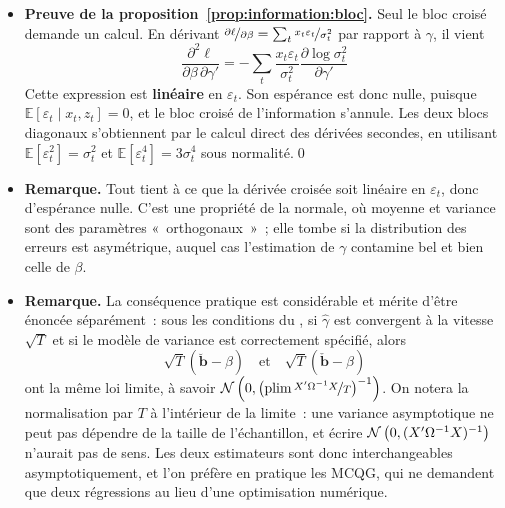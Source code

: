 \documentclass[10pt]{beamer}
\begin{document}
\begin{notes}

  \begin{itemize}

  \item \textbf{Preuve de la proposition~\ref{prop:information:bloc}.} Seul le
    bloc croisé demande un calcul. En dérivant
    $\nicefrac{\partial\ell}{\partial\beta} =
    \sum_t\nicefrac{x_t\varepsilon_t}{\sigma_t^2}$ par rapport à $\gamma$, il
    vient
    \[
      \frac{\partial^2\ell}{\partial\beta\,\partial\gamma'} =
      -\sum_t \frac{x_t\varepsilon_t}{\sigma_t^2}
      \frac{\partial \log\sigma_t^2}{\partial\gamma'}
    \]
    Cette expression est \textbf{linéaire} en $\varepsilon_t$. Son espérance est
    donc nulle, puisque $\mathbb E[\varepsilon_t\mid x_t,z_t]=0$, et le bloc
    croisé de l'information s'annule. Les deux blocs diagonaux s'obtiennent par
    le calcul direct des dérivées secondes, en utilisant
    $\mathbb E[\varepsilon_t^2]=\sigma_t^2$ et
    $\mathbb E[\varepsilon_t^4]=3\sigma_t^4$ sous normalité.\qed\newline

  \item \textbf{Remarque.} Tout tient à ce que la dérivée croisée soit linéaire
    en $\varepsilon_t$, donc d'espérance nulle. C'est une propriété de la
    normale, où moyenne et variance sont des paramètres «~orthogonaux~»~; elle
    tombe si la distribution des erreurs est asymétrique, auquel cas
    l'estimation de $\gamma$ contamine bel et bien celle de $\beta$.\newline

  \item \textbf{Remarque.} La conséquence pratique est considérable et mérite
    d'être énoncée séparément~: sous les conditions du , si
    $\hat\gamma$ est convergent à la vitesse $\sqrt T$ et si le modèle de
    variance est correctement spécifié, alors
    \[
      \sqrt T\left(\breve{\mathbf b} - \beta\right)
      \quad\text{et}\quad
      \sqrt T\left(\check{\mathbf b} - \beta\right)
    \]
    ont la même loi limite, à savoir
    $\mathcal N\left(0,\left(\text{plim}\,\nicefrac{X'\Omega^{-1}X}{T}\right)^{-1}\right)$.
    On notera la normalisation par $T$ à l'intérieur de la limite~: une
    variance asymptotique ne peut pas dépendre de la taille de l'échantillon, et
    écrire $\mathcal N\left(0,(X'\Omega^{-1}X)^{-1}\right)$ n'aurait pas de sens. Les deux
    estimateurs sont donc interchangeables asymptotiquement, et l'on préfère en
    pratique les MCQG, qui ne demandent que deux régressions au lieu d'une
    optimisation numérique.

  \end{itemize}

\end{notes}
\end{document}
